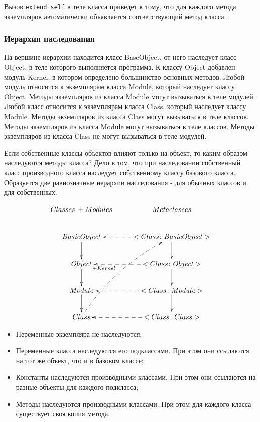 \begin{note}
  Вызов \verb!extend self! в теле класса приведет к тому, что для каждого метода экземпляров автоматически объявляется соответствующий метод класса.
\end{note}

\subsubsection*{Иерархия наследования}

На вершине иерархии находится класс BaseObject, от него наследует класс Object, в теле которого выполняется программа. К классу Object добавлен модуль Kernel, в котором определено большинство основных методов. Любой модуль относится к экземплярам класса Module, который наследует классу Object. Методы экземпляров из класса Module могут вызываться в теле модулей. Любой класс относится к экземплярам класса Class, который наследует классу Module. Методы экземпляров из класса Class могут вызываться в теле классов. Методы экземпляров из класса Module могут вызываться в теле классов. Методы экземпляров из класса Class не могут вызываться в теле модулей.

\begin{note}
  Если собственные классы объектов влияют только на объект, то каким-образом наследуются методы класса? Дело в том, что при наследовании собственный класс производного класса наследует собственному классу базового класса. Образуется две равнозначные иерархии наследования - для обычных классов и для собственных.
\end{note}

$$
  \xymatrix{
  Classes \: +Modules &  Metaclasses\\
  BasicObject \ar[d] & <Class\colon BasicObject > \ar@{-->}[l] \ar[d] \\
  Object \ar[d] & <Class\colon Object> \ar@{-->}[l]^(0.75){+Kernel} \ar[d]\\
  Module \ar[d] & <Class\colon Module> \ar@{-->}[l] \ar[d]\\
  Class \ar@/^1pc/@{-->}[ruuu] & <Class\colon Class> \ar@{-->}[l] }
$$

\begin{itemize} 
  \item Переменные экземпляра не наследуются;

  \item Переменные класса наследуются его подклассами. При этом они ссылаются на тот же объект, что и в базовом классе;

  \item Константы наследуются производными классами. При этом они ссылаются на разные объекты для каждого подкласса;

  \item Методы наследуются производными классами. При этом для каждого класса существует своя копия метода.
\end{itemize}

